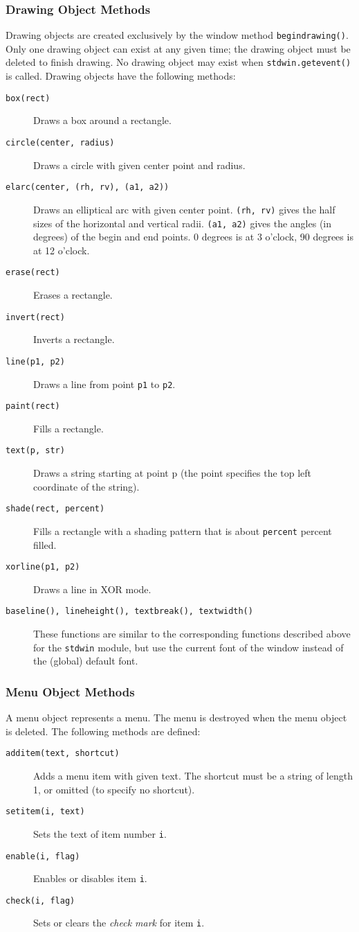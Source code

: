 \subsubsection{Drawing Object Methods}

Drawing objects are created exclusively by the window method
{\tt begindrawing()}.
Only one drawing object can exist at any given time; the drawing object
must be deleted to finish drawing.
No drawing object may exist when
{\tt stdwin.getevent()}
is called.
Drawing objects have the following methods:
\begin{description}
\item[{\tt box(rect)}]
Draws a box around a rectangle.
\item[{\tt circle(center, radius)}]
Draws a circle with given center point and radius.
\item[{\tt elarc(center, (rh, rv), (a1, a2))}]
Draws an elliptical arc with given center point.
{\tt (rh, rv)}
gives the half sizes of the horizontal and vertical radii.
{\tt (a1, a2)}
gives the angles (in degrees) of the begin and end points.
0 degrees is at 3 o'clock, 90 degrees is at 12 o'clock.
\item[{\tt erase(rect)}]
Erases a rectangle.
\item[{\tt invert(rect)}]
Inverts a rectangle.
\item[{\tt line(p1, p2)}]
Draws a line from point
{\tt p1}
to
{\tt p2}.
\item[{\tt paint(rect)}]
Fills a rectangle.
\item[{\tt text(p, str)}]
Draws a string starting at point p (the point specifies the
top left coordinate of the string).
\item[{\tt shade(rect, percent)}]
Fills a rectangle with a shading pattern that is about
{\tt percent}
percent filled.
\item[{\tt xorline(p1, p2)}]
Draws a line in XOR mode.
\item[{\tt baseline(), lineheight(), textbreak(), textwidth()}]
These functions are similar to the corresponding functions described
above for the
{\tt stdwin}
module, but use the current font of the window instead of the (global)
default font.
\end{description}

\subsubsection{Menu Object Methods}

A menu object represents a menu.
The menu is destroyed when the menu object is deleted.
The following methods are defined:
\begin{description}
\item[{\tt additem(text, shortcut)}]
Adds a menu item with given text.
The shortcut must be a string of length 1, or omitted (to specify no
shortcut).
\item[{\tt setitem(i, text)}]
Sets the text of item number
{\tt i}.
\item[{\tt enable(i, flag)}]
Enables or disables item
{\tt i}.
\item[{\tt check(i, flag)}]
Sets or clears the
{\em check mark}
for item
{\tt i}.
\end{description}

